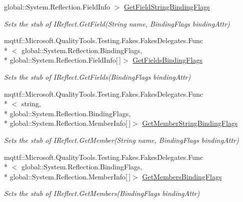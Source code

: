 \begin{DoxyCompactItemize}
global\-::\-System.\-Reflection.\-Field\-Info $>$ \hyperlink{class_system_1_1_runtime_1_1_interop_services_1_1_expando_1_1_fakes_1_1_stub_i_expando_a326e3a37abedb03eb2746d7f507754f8}{Get\-Field\-String\-Binding\-Flags}
\begin{DoxyCompactList}\small\item\em Sets the stub of I\-Reflect.\-Get\-Field(\-String name, Binding\-Flags binding\-Attr)\end{DoxyCompactList}\item 
mqttf\-::\-Microsoft.\-Quality\-Tools.\-Testing.\-Fakes.\-Fakes\-Delegates.\-Func\\*
$<$ global\-::\-System.\-Reflection.\-Binding\-Flags, \\*
global\-::\-System.\-Reflection.\-Field\-Info\mbox{[}$\,$\mbox{]}$>$ \hyperlink{class_system_1_1_runtime_1_1_interop_services_1_1_expando_1_1_fakes_1_1_stub_i_expando_aab2c2b22e98e57876adc9d798e88bc10}{Get\-Fields\-Binding\-Flags}
\begin{DoxyCompactList}\small\item\em Sets the stub of I\-Reflect.\-Get\-Fields(\-Binding\-Flags binding\-Attr)\end{DoxyCompactList}\item 
mqttf\-::\-Microsoft.\-Quality\-Tools.\-Testing.\-Fakes.\-Fakes\-Delegates.\-Func\\*
$<$ string, \\*
global\-::\-System.\-Reflection.\-Binding\-Flags, \\*
global\-::\-System.\-Reflection.\-Member\-Info\mbox{[}$\,$\mbox{]}$>$ \hyperlink{class_system_1_1_runtime_1_1_interop_services_1_1_expando_1_1_fakes_1_1_stub_i_expando_a9a3c3ed22a5c5b0dc79c1477451c0566}{Get\-Member\-String\-Binding\-Flags}
\begin{DoxyCompactList}\small\item\em Sets the stub of I\-Reflect.\-Get\-Member(\-String name, Binding\-Flags binding\-Attr)\end{DoxyCompactList}\item 
mqttf\-::\-Microsoft.\-Quality\-Tools.\-Testing.\-Fakes.\-Fakes\-Delegates.\-Func\\*
$<$ global\-::\-System.\-Reflection.\-Binding\-Flags, \\*
global\-::\-System.\-Reflection.\-Member\-Info\mbox{[}$\,$\mbox{]}$>$ \hyperlink{class_system_1_1_runtime_1_1_interop_services_1_1_expando_1_1_fakes_1_1_stub_i_expando_aaa19daeaa8f26e13c4dc3945c414e86f}{Get\-Members\-Binding\-Flags}
\begin{DoxyCompactList}\small\item\em Sets the stub of I\-Reflect.\-Get\-Members(\-Binding\-Flags binding\-Attr)\end{DoxyCompactList}\item 

\end{DoxyCompactItemize}
